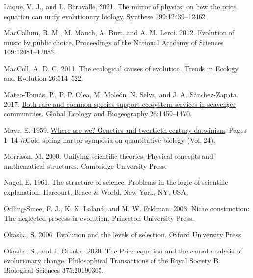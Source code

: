 \documentclass[
]{article}
\newlength{\cslhangindent}
\newenvironment{CSLReferences}[2] %
 {\begin{list}{}{%
  \setlength{\itemindent}{0pt}
  \setlength{\leftmargin}{0pt}
  \setlength{\parsep}{0pt}
  \ifodd #1
   \setlength{\leftmargin}{\cslhangindent}
   \setlength{\itemindent}{-1\cslhangindent}
  \fi
  \setlength{\itemsep}{#2\baselineskip}}}
 {\end{list}}
\begin{document}
\begin{CSLReferences}{0}{0}
Luque, V. J., and L. Baravalle. 2021.
\href{https://doi.org/10.1007/s11229-021-03339-6}{{The mirror of
physics: on how the price equation can unify evolutionary biology}}.
Synthese 199:12439--12462.

MacCallum, R. M., M. Mauch, A. Burt, and A. M. Leroi. 2012.
\href{https://doi.org/10.5061/dryad.h0228}{{Evolution of music by public
choice}}. Proceedings of the National Academy of Sciences
109:12081--12086.

MacColl, A. D. C. 2011.
\href{https://doi.org/10.1016/j.tree.2011.06.009}{{The ecological causes
of evolution}}. Trends in Ecology and Evolution 26:514--522.

Mateo-Tomás, P., P. P. Olea, M. Moleón, N. Selva, and J. A.
Sánchez-Zapata. 2017. \href{https://doi.org/10.1111/geb.12673}{{Both
rare and common species support ecosystem services in scavenger
communities}}. Global Ecology and Biogeography 26:1459--1470.

Mayr, E. 1959. \href{https://doi.org/10.1101/SQB.1959.024.01.003}{Where
are we? Genetics and twentieth century darwinism}. Pages 1--14
\emph{in}Cold spring harbor symposia on quantitative biology (Vol. 24).

Morrison, M. 2000. Unifying scientific theories: Physical concepts and
mathematical structures. Cambridge University Press.

Nagel, E. 1961. The structure of science: Problems in the logic of
scientific explanation. Harcourt, Brace \& World, New York, NY, USA.

Odling-Smee, F. J., K. N. Laland, and M. W. Feldman. 2003. Niche
construction: The neglected process in evolution. Princeton University
Press.

Okasha, S. 2006.
\href{https://doi.org/10.1093/acprof:oso/9780199267972.001.0001}{Evolution
and the levels of selection}. Oxford University Press.

Okasha, S., and J. Otsuka. 2020.
\href{https://doi.org/10.1098/rstb.2019.0365}{{The Price equation and
the causal analysis of evolutionary change}}. Philosophical Transactions
of the Royal Society B: Biological Sciences 375:20190365.


\end{CSLReferences}
\end{document}
